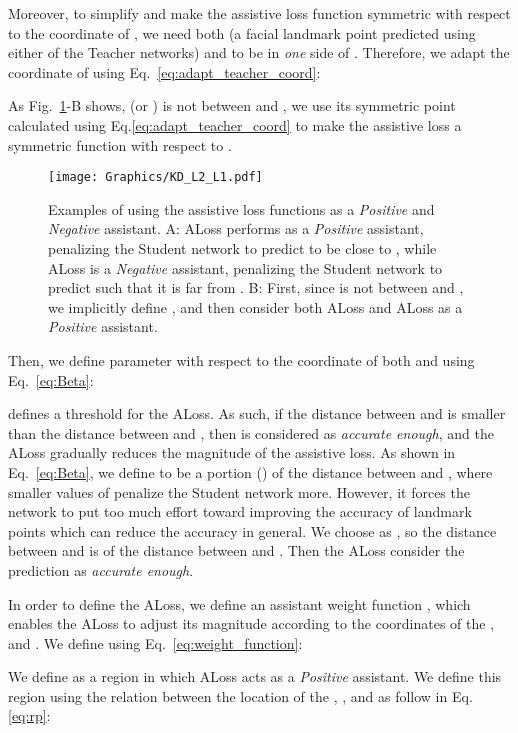 \documentclass[times,twocolumn,final,authoryear]{elsarticle}
\begin{document}
Moreover, to simplify and make the assistive loss function symmetric with respect to the coordinate of , we need both  (a facial landmark point predicted using either of the Teacher networks) and  to be in \textit{one} side of . Therefore, we adapt the coordinate of  using Eq.~\ref{eq:adapt_teacher_coord}:

As Fig.~\ref{fig:l2_vs_l1}-B shows,  (or ) is not between  and , we use its symmetric point  calculated using Eq.\ref{eq:adapt_teacher_coord} to make the assistive loss a symmetric function with respect to .
\begin{figure}[t]
\centering
\texttt{[image: Graphics/KD\_L2\_L1.pdf]}
\caption{Examples of using the assistive loss functions as a \textit{Positive} and \textit{Negative} assistant. A: ALoss performs as a \textit{Positive} assistant, penalizing the Student network to predict  to be close to , while ALoss is a \textit{Negative} assistant, penalizing the Student network to predict  such that it is far from . B: First, since  is not between  and , we implicitly define , and then consider both ALoss and ALoss as a \textit{Positive} assistant.}
\label{fig:l2_vs_l1}
\end{figure}
Then, we define parameter  with respect to the coordinate of both  and  using Eq.~\ref{eq:Beta}:

 defines a threshold for the ALoss. As such, if the distance between  and  is smaller than the distance between  and , then  is considered as \textit{accurate enough}, and the ALoss gradually reduces the magnitude of the assistive loss. As shown in Eq.~\ref{eq:Beta}, we define  to be a portion () of the distance between  and , where smaller values of  penalize the Student network more. However, it forces the network to put too much effort toward improving the accuracy of landmark points which can reduce the accuracy in general. We choose  as , so the distance between  and  is  of the distance between  and . Then the ALoss consider the prediction as \textit{accurate enough}.

In order to define the ALoss, we define an assistant weight function , which enables the ALoss to adjust its magnitude according to the coordinates of the ,  and . We define  using Eq.~\ref{eq:weight_function}:



We define  as a region in which ALoss acts as a \textit{Positive} assistant. We define this region using the relation between the location of the , , and  as follow in Eq.\ref{eq:rp}:
\end{document}
